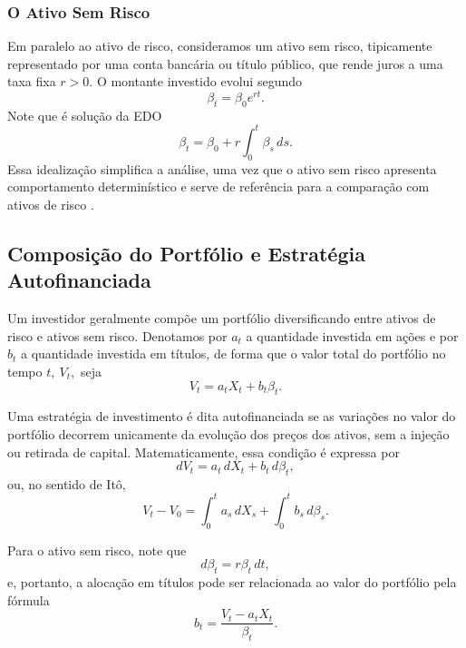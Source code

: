 \documentclass[12pt,openright,oneside,a4paper]{abntex2}
\numberwithin{equation}{section}
\begin{document}
\subsubsection{O Ativo Sem Risco}

Em paralelo ao ativo de risco, consideramos um ativo sem risco, tipicamente representado por uma conta bancária ou título público, que rende juros a uma taxa fixa $r>0$. O montante investido evolui segundo
\begin{equation}
    \beta_t = \beta_0 e^{rt}.
\end{equation}
Note que é solução da EDO 
\begin{equation}
    \beta_t = \beta_0 + r \int_0^t \beta_s \, ds.
\end{equation}
Essa idealização simplifica a análise, uma vez que o ativo sem risco apresenta comportamento determinístico e serve de referência para a comparação com ativos de risco \parencite [p.~169] {Mikosh}.

\subsection{Composição do Portfólio e Estratégia Autofinanciada}

Um investidor geralmente compõe um portfólio diversificando entre ativos de risco e ativos sem risco. Denotamos por $a_t$ a quantidade investida em ações e por $b_t$ a quantidade investida em títulos, de forma que o valor total do portfólio no tempo $t, \: V_t,$ seja
\begin{equation}
    V_t = a_t X_t + b_t \beta_t.
\end{equation}

Uma estratégia de investimento é dita autofinanciada se as variações no valor do portfólio decorrem unicamente da evolução dos preços dos ativos, sem a injeção ou retirada de capital. Matematicamente, essa condição é expressa por
\begin{equation}
    dV_t = a_t \, dX_t + b_t \, d\beta_t,
\end{equation}
ou, no sentido de Itô,
\begin{equation}
    V_t - V_0 = \int_0^t a_s \, dX_s + \int_0^t b_s \, d\beta_s.
\end{equation}

Para o ativo sem risco, note que
\begin{equation}
    d\beta_t = r \beta_t \, dt,
\end{equation}
e, portanto, a alocação em títulos pode ser relacionada ao valor do portfólio pela fórmula
\begin{equation}
    b_t = \frac{V_t - a_t X_t}{\beta_t}.
\end{equation}
\end{document}
